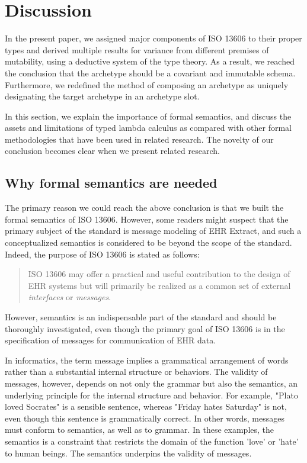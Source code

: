 \documentclass[preprint,3p,onecolumn,times,review]{elsarticle}
\begin{document}
\section{Discussion}

In the present paper, we assigned major components of ISO 13606 to their proper types and derived multiple results for variance from different premises of mutability, using a deductive system of the type theory. As a result, we reached the conclusion that the archetype should be a covariant and immutable schema. Furthermore, we redefined the method of composing an archetype as uniquely designating the target archetype in an archetype slot.

In this section, we explain the importance of formal semantics, and discuss the assets and limitations of typed lambda calculus as compared with other formal methodologies that have been used in related research.
The novelty of our conclusion becomes clear when we present related research.


\subsection{Why formal semantics are needed}

The primary reason we could reach the above conclusion is that we built the formal semantics of ISO 13606. However, some readers might suspect that the primary subject of the standard is message modeling of EHR Extract, and such a conceptualized semantics is considered to be beyond the scope of the standard.
Indeed, the purpose of ISO 13606 is stated as follows:
\begin{quote}
  ISO 13606 may offer a practical and useful contribution to the design of EHR systems but will primarily be realized as a common set of external {\it interfaces} or {\it messages}.\cite[v]{iso08:13606_healt_elect_part1}
\end{quote}


However, semantics is an indispensable part of the standard and should be thoroughly investigated, even though the primary goal of ISO 13606 is in the specification of messages for communication of EHR data.

In informatics, the term message implies a grammatical arrangement of words rather than a substantial internal structure or behaviors. The validity of messages, however, depends on not only the grammar but also the semantics, an underlying principle for the internal structure and behavior. For example, "Plato loved Socrates" is a sensible sentence, whereas "Friday hates Saturday" is not, even though this sentence is grammatically correct. In other words, messages must conform to semantics, as well as to grammar. In these examples, the semantics is a constraint that restricts the domain of the function 'love' or 'hate' to human beings. The semantics underpins the validity of messages.
\end{document}
